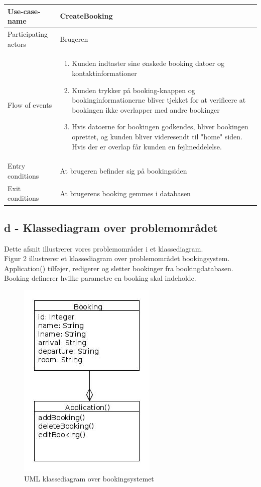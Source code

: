 \documentclass[12pt,a4paper]{article}
\begin{document}
\bigskip

\begin{minipage}{\textwidth}

 \label{tab:title}
\begin{tabular}{| p{5cm} p{10cm} |}
\hline Use-case-name & CreateBooking \\
\hline Participating actors & Brugeren \\
\hline Flow of events & \begin{enumerate}
\item Kunden indtaster sine ønskede booking datoer og kontaktinformationer 
\item Kunden trykker på booking-knappen og bookinginformationerne bliver tjekket for at verificere at bookingen ikke overlapper med andre bookinger
\item Hvis datoerne for bookingen godkendes, bliver bookingen oprettet, og kunden bliver videresendt til "home" siden. Hvis der er overlap får kunden en fejlmeddelelse.
\end{enumerate} \\
\hline Entry conditions & At brugeren befinder sig på bookingsiden \\
\hline Exit conditions & At brugerens booking gemmes i databasen  \\
\hline
\end{tabular}

\end{minipage}	
	
\subsection{d - Klassediagram over problemområdet}
Dette afsnit illustrerer vores problemområder i et klassediagram.\\
Figur 2 illustrerer et klassediagram over problemområdet  bookingsystem. Application() tilføjer, redigerer og sletter bookinger fra bookingdatabasen. Booking definerer hvilke parametre en booking skal indeholde.
\begin{figure}[H]
\centering
\includegraphics[scale=0.6]{BookingSystem.jpg}
\caption{UML klassediagram over bookingsystemet}
\end{figure}
\end{document}
